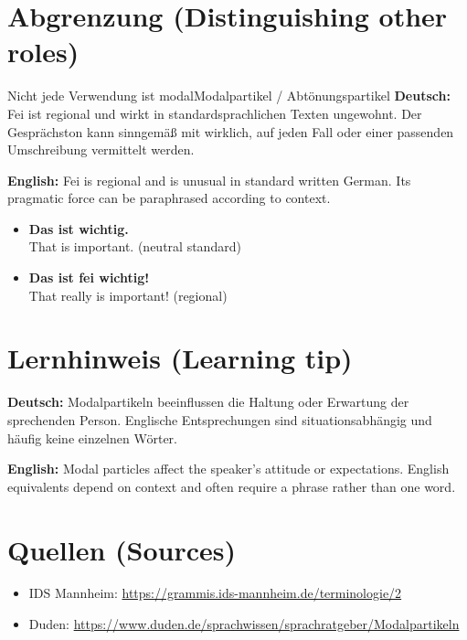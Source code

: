 \documentclass[a4paper,11pt]{article}
\newcommand{\GermanText}[1]{\textbf{Deutsch: }#1\par}
\newcommand{\EnglishText}[1]{{\small\color{SoftGray}\textbf{English: }#1\par}}
\newcommand{\ExampleItem}[2]{\item \textbf{#1}\\{\small\color{SoftGray}#2}}
\begin{document}
\section{Abgrenzung \textnormal{(Distinguishing other roles)}}
\begin{grammarentry}{Nicht jede Verwendung ist modal}{Modalpartikel / Abtönungspartikel}
\GermanText{Fei ist regional und wirkt in standardsprachlichen Texten ungewohnt. Der Gesprächston kann sinngemäß mit wirklich, auf jeden Fall oder einer passenden Umschreibung vermittelt werden.}
\EnglishText{Fei is regional and is unusual in standard written German. Its pragmatic force can be paraphrased according to context.}
\end{grammarentry}
\begin{exbox}\begin{itemize}
\ExampleItem{Das ist wichtig.}{That is important. (neutral standard)}
\ExampleItem{Das ist fei wichtig!}{That really is important! (regional)}
\end{itemize}\end{exbox}
\section{Lernhinweis \textnormal{(Learning tip)}}
\GermanText{Modalpartikeln beeinflussen die Haltung oder Erwartung der sprechenden Person. Englische Entsprechungen sind situationsabhängig und häufig keine einzelnen Wörter.}
\EnglishText{Modal particles affect the speaker's attitude or expectations. English equivalents depend on context and often require a phrase rather than one word.}
\section{Quellen \textnormal{(Sources)}}
\begin{itemize}
\item IDS Mannheim: \url{https://grammis.ids-mannheim.de/terminologie/2}
\item Duden: \url{https://www.duden.de/sprachwissen/sprachratgeber/Modalpartikeln}
\end{itemize}
\end{document}

